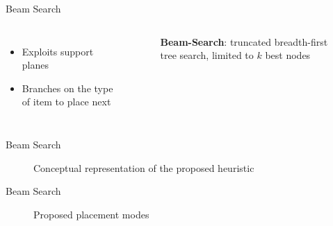 \documentclass{beamer}
\begin{document}
    \begin{frame}{Beam Search}
        \begin{columns}[onlytextwidth,T]
        \column{\dimexpr\linewidth-75mm-5mm}
        \vspace{5mm}
        \begin{itemize}
            \item Exploits support planes
            \item Branches on the type of item to place next
        \end{itemize}
        \column{75mm}
            \begin{figure}[h]
                \caption*{\textbf{Beam-Search}: truncated breadth-first tree search, limited to $k$ best nodes}
                \resizebox*{\columnwidth}{!}{%
                
                }
            \end{figure}
        \end{columns}
    \end{frame}
    \begin{frame}{Beam Search}
        \begin{figure}[h]
            \resizebox*{!}{.7\textheight}{%
            
            }
            \caption*{Conceptual representation of the proposed heuristic}
        \end{figure}
    \end{frame}
    \begin{frame}{Beam Search}
        \begin{figure}[h]
            \resizebox*{!}{.65\textheight}{%
            
            }
            \caption*{Proposed placement modes}
        \end{figure}
    \end{frame}
\end{document}
